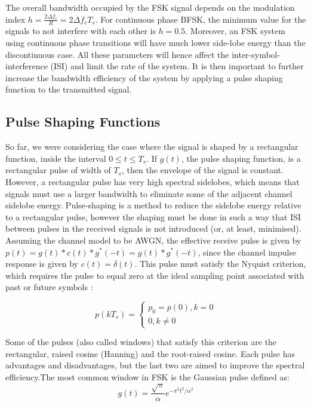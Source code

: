 \documentclass[12pt,a4paper,openright]{article}
\begin{document}
The overall bandwidth occupied by the FSK signal depends on the modulation index $h=\frac{2\Delta {f_c}}{R}=2\Delta {f_c}T_s$. For continuous phase BFSK, the minimum value for the signals to not interfere with each other is $h=0.5$. Moreover, an FSK system using continuous phase transitions will have much lower side-lobe energy than the discontinuous case. All these parameters will hence affect the inter-symbol-interference (ISI) and limit the rate of the system. It is then important to further increase the bandwidth efficiency of the system by applying a pulse shaping function to the transmitted signal.

\subsection{Pulse Shaping Functions}

So far, we were considering the case where the signal is shaped by a rectangular function, inside the interval $0\leq t \leq T_s$. If $g(t)$, the pulse shaping function, is a rectangular pulse of width of $T_s$, then the envelope of the signal is constant. However, a rectangular pulse has very high spectral sidelobes, which means that signals must use a larger bandwidth to eliminate some of the adjacent channel sidelobe energy. Pulse-shaping is a method to reduce the sidelobe energy relative to a rectangular pulse, however the shaping must be done in such a way that ISI between pulses in the received signals is not introduced (or, at least, minimised). Assuming the channel model to be AWGN, the effective receive pulse is given by $p(t)=g(t) \ast c(t) \ast g^{*}(-t)=g(t) \ast g^{*}(-t)$, since the channel impulse response is given by $c(t)=\delta(t)$. This pulse must satisfy the Nyquist criterion, which requires the pulse to equal zero at the ideal sampling point associated with past or future symbols \cite{GoertzelPaper}: 

 \[p(k{T_s}) = \left\{ \begin{array}{l}
{p_0} = p(0),k = 0\\
0,k \ne 0
\end{array} \right.\]

Some of the pulses (also called windows) that satisfy this criterion are the rectangular, raised cosine (Hanning) and the root-raised cosine. Each pulse has advantages and disadvantages, but the last two are aimed to improve the spectral efficiency.The most common window in FSK is the Gaussian pulse defined as: 
\[g(t) = \frac{{\sqrt \pi  }}{\alpha }{e^{ - {\pi ^2}{t^2}/{\alpha ^2}}}\]
\end{document}
